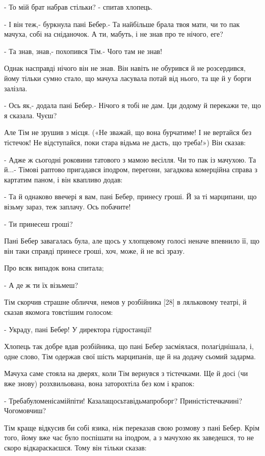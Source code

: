 - То мій брат набрав стільки? - спитав хлопець.

- І він теж,- буркнула пані Бебер.- Та найбільше брала твоя мати, чи то пак мачуха, собі на сніданочок. А ти, мабуть, і не знав про те нічого, еге?

- Та знав, знав,- похопився Тім.- Чого там не знав!

Однак насправді нічого він не знав. Він навіть не обурився й не розсердився, йому тільки сумно стало, що мачуха ласувала потай від нього, та ще й у борги залізла.

- Ось як,- додала пані Бебер.- Нічого я тобі не дам. Іди додому й перекажи те, що я сказала. Чуєш?

Але Тім не зрушив з місця. («Не зважай, що вона бурчатиме! І не вертайся без тістечок! Не відступайся, поки стара відьма не дасть, що треба!») Він сказав:

- Адже ж сьогодні роковини татового з мамою весілля. Чи то пак із мачухою. Та й...- Тімові раптово пригадався іподром, перегони, загадкова комерційна справа з картатим паном, і він квапливо додав:

- Та й однаково ввечері я вам, пані Бебер, принесу гроші. Й за ті марципани, що візьму зараз, теж заплачу. Ось побачите!

- Ти принесеш гроші?

Пані Бебер завагалась була, але щось у хлопцевому голосі неначе впевнило її, що він таки справді принесе гроші, хоч, може, й не всі зразу.

Про всяк випадок вона спитала;

- А де ж ти їх візьмеш?

Тім скорчив страшне обличчя, немов у розбійника [28] в ляльковому театрі, й сказав якомога товстішим голосом:

- Украду, пані Бебер! У директора гідростанції!

Хлопець так добре вдав розбійника, що пані Бебер засміялася, полагіднішала, і, одне слово, Тім одержав свої шість марципанів, ще й на додачу сьомий задарма.

Мачуха саме стояла на дверях, коли Тім вернувся з тістечками. Ще й досі (чи вже знову) розхвильована, вона заторохтіла без ком і крапок:

- Требабуломенісамійпіти! Казалащосьтавідьмапроборг? Приністістечкачині? Чогомовчиш?

Тім краще відкусив би собі язика, ніж переказав свою розмову з пані Бебер. Крім того, йому вже час було поспішати на іподром, а з мачухою як заведешся, то не скоро відкараскаєшся. Тому він тільки сказав:

